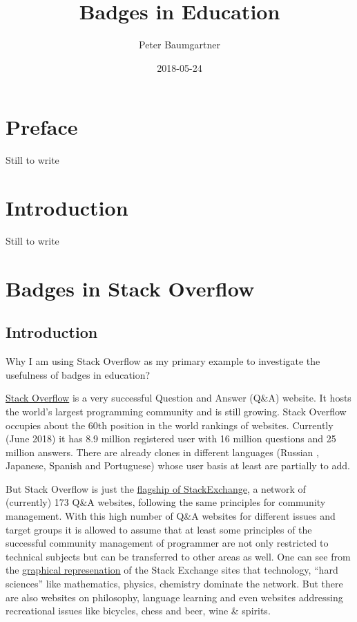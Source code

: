\documentclass[]{book}
\title{Badges in Education}
\author{Peter Baumgartner}
\date{2018-05-24}
\theoremstyle{definition}
\theoremstyle{definition}
\theoremstyle{definition}
\theoremstyle{remark}
\begin{document}
\maketitle

{
\setcounter{tocdepth}{1}
\tableofcontents
}
\chapter{Preface}\label{preface}

Still to write

\chapter{Introduction}\label{intro}

Still to write

\chapter{Badges in Stack Overflow}\label{badges-in-stack-overflow}

\section{Introduction}\label{introduction}

Why I am using Stack Overflow as my primary example to investigate the
usefulness of badges in education?

\href{https://stackoverflow.com/}{Stack Overflow} is a very successful
Question and Answer (Q\&A) website. It hosts the world's largest
programming community and is still growing. Stack Overflow occupies
about the 60th position in the world rankings of websites. Currently
(June 2018) it has 8.9 million registered user with 16 million questions
and 25 million answers. There are already clones in different languages
(Russian , Japanese, Spanish and Portuguese) whose user basis at least
are partially to add.

But Stack Overflow is just the
\href{https://stackexchange.com/sites\#traffic}{flagship of
StackExchange}, a network of (currently) 173 Q\&A websites, following
the same principles for community management. With this high number of
Q\&A websites for different issues and target groups it is allowed to
assume that at least some principles of the successful community
management of programmer are not only restricted to technical subjects
but can be transferred to other areas as well. One can see from the
\href{https://stackexchange.com/sites?view=grid\#}{graphical
represenation} of the Stack Exchange sites that technology, ``hard
sciences'' like mathematics, physics, chemistry dominate the network.
But there are also websites on philosophy, language learning and even
websites addressing recreational issues like bicycles, chess and beer,
wine \& spirits.
\end{document}
